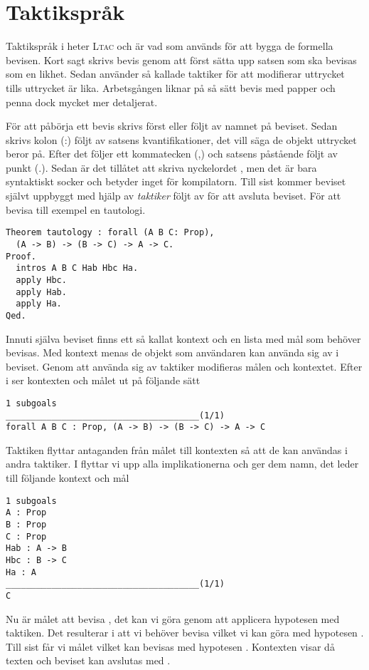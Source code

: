 \section{Taktikspråk}
Taktikspråk i \coq{} heter \textsc{Ltac} och är vad som används för att bygga
de formella bevisen. Kort sagt skrivs bevis genom att först sätta upp satsen
som ska bevisas som en likhet. Sedan använder så kallade taktiker för att
modifierar uttrycket tills uttrycket är lika. Arbetsgången liknar på så sätt
bevis med papper och penna dock mycket mer detaljerat.

För att påbörja ett bevis skrivs först  eller  följt av
namnet på beviset. Sedan skrivs kolon (:) följt av satsens kvantifikationer,
det vill säga de objekt uttrycket beror på. Efter det följer ett kommatecken
(,) och satsens påstående följt av punkt (.). Sedan är det tillåtet att skriva
nyckelordet , men det är bara syntaktiskt socker och betyder inget för
kompilatorn. Till sist kommer beviset självt uppbyggt med hjälp av
\emph{taktiker} följt av  för att avsluta beviset. För att bevisa till
exempel en tautologi.

\begin{lstlisting}
Theorem tautology : forall (A B C: Prop),
  (A -> B) -> (B -> C) -> A -> C.
Proof.
  intros A B C Hab Hbc Ha.
  apply Hbc.
  apply Hab.
  apply Ha.
Qed.
\end{lstlisting}

Innuti själva beviset finns ett så kallat kontext och en lista med mål som
behöver bevisas. Med kontext menas de objekt som användaren kan använda sig av
i beviset. Genom att använda sig av taktiker modifieras målen och kontextet.
Efter  i  ser kontexten och målet ut på följande sätt
\begin{lstlisting}
1 subgoals
______________________________________(1/1)
forall A B C : Prop, (A -> B) -> (B -> C) -> A -> C
\end{lstlisting}

Taktiken  flyttar antaganden från målet till kontexten så att de kan
användas i andra taktiker. I  flyttar vi upp alla implikationerna
och ger dem namn, det leder till följande kontext och mål
\begin{lstlisting}
1 subgoals
A : Prop
B : Prop
C : Prop
Hab : A -> B
Hbc : B -> C
Ha : A
______________________________________(1/1)
C
\end{lstlisting}

Nu är målet att bevisa , det kan vi göra genom att applicera hypotesen
 med  taktiken. Det resulterar i att vi behöver bevisa 
vilket vi kan göra med hypotesen . Till sist får vi målet  vilket
kan bevisas med hypotesen . Kontexten visar då texten  och beviset kan avslutas med .
